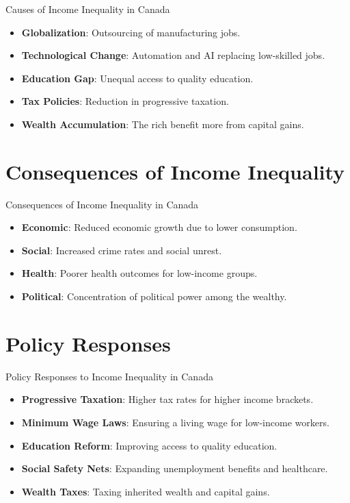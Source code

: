 \documentclass{beamer}
\begin{document}
\begin{frame}{Causes of Income Inequality in Canada}
\begin{itemize}
    \item \textbf{Globalization}: Outsourcing of manufacturing jobs.
    \item \textbf{Technological Change}: Automation and AI replacing low-skilled jobs.
    \item \textbf{Education Gap}: Unequal access to quality education.
    \item \textbf{Tax Policies}: Reduction in progressive taxation.
    \item \textbf{Wealth Accumulation}: The rich benefit more from capital gains.
\end{itemize}
\end{frame}

\section{Consequences of Income Inequality}

\begin{frame}{Consequences of Income Inequality in Canada}
\begin{itemize}
    \item \textbf{Economic}: Reduced economic growth due to lower consumption.
    \item \textbf{Social}: Increased crime rates and social unrest.
    \item \textbf{Health}: Poorer health outcomes for low-income groups.
    \item \textbf{Political}: Concentration of political power among the wealthy.
\end{itemize}
\end{frame}

\section{Policy Responses}

\begin{frame}{Policy Responses to Income Inequality in Canada}
\begin{itemize}
    \item \textbf{Progressive Taxation}: Higher tax rates for higher income brackets.
    \item \textbf{Minimum Wage Laws}: Ensuring a living wage for low-income workers.
    \item \textbf{Education Reform}: Improving access to quality education.
    \item \textbf{Social Safety Nets}: Expanding unemployment benefits and healthcare.
    \item \textbf{Wealth Taxes}: Taxing inherited wealth and capital gains.
\end{itemize}
\end{frame}
\end{document}
